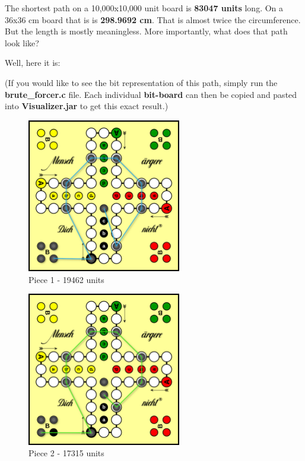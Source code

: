 \documentclass[12pt]{article}
\begin{document}
The shortest path on a 10,000x10,000 unit board is \textbf{83047 units} long.
On a 36x36 cm board that is is \textbf{298.9692 cm}.
That is almost twice the circumference. But the length is mostly meaningless. More importantly, what does that path look like?

Well, here it is:


(If you would like to see the bit representation of this path, simply run the \textbf{brute\_forcer.c} file. Each individual \textbf{bit-board} can then be copied and pasted into \textbf{Visualizer.jar} to get this exact result.)

\begin{figure}[htbp]
    \centering
    \includegraphics[width=0.6\textwidth]{images/Figure8}
    \caption{Piece 1 - 19462 units}
    \label{fig:piece1}
\end{figure}

\begin{figure}[htbp]
    \centering
    \includegraphics[width=0.6\textwidth]{images/Figure9}
    \caption{Piece 2 - 17315 units}
    \label{fig:piece2}
\end{figure}
\end{document}

